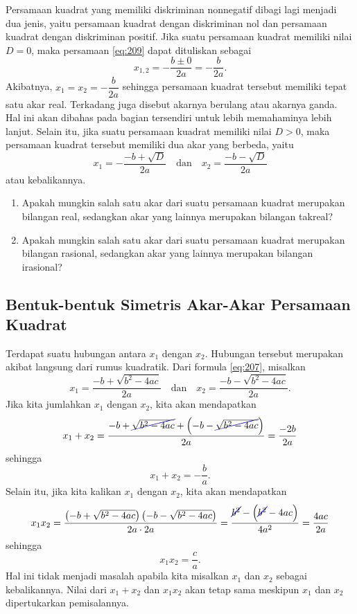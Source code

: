 	\par Persamaan kuadrat yang memiliki diskriminan nonnegatif dibagi lagi menjadi dua jenis, yaitu persamaan kuadrat dengan diskriminan nol dan persamaan kuadrat dengan diskriminan positif. Jika suatu persamaan kuadrat memiliki nilai $ D = 0 $, maka persamaan \ref{eq:209} dapat dituliskan sebagai
	\[ x_{1, 2} = -\frac{b \pm 0}{2a} = -\frac{b}{2a}. \]
	Akibatnya, $ x_{1} = x_{2} = -\dfrac{b}{2a} $ sehingga persamaan kuadrat tersebut memiliki tepat satu akar real. Terkadang juga disebut akarnya berulang atau akarnya ganda. Hal ini akan dibahas pada bagian tersendiri untuk lebih memahaminya lebih lanjut. Selain itu, jika suatu persamaan kuadrat memiliki nilai $ D > 0 $, maka persamaan kuadrat tersebut memiliki dua akar yang berbeda, yaitu
	\[ x_{1} = -\frac{-b + \sqrt{D}}{2a} \quad \mbox{dan} \quad x_{2} = \frac{-b - \sqrt{D}}{2a} \]
	atau kebalikannya.
	
	\begin{explbox}
		\begin{enumerate}[nosep, leftmargin=*]
			\item Apakah mungkin salah satu akar dari suatu persamaan kuadrat merupakan bilangan real, sedangkan akar yang lainnya merupakan bilangan takreal?
			\item Apakah mungkin salah satu akar dari suatu persamaan kuadrat merupakan bilangan rasional, sedangkan akar yang lainnya merupakan bilangan irasional?
		\end{enumerate}
	\end{explbox}
	
\subsection{Bentuk-bentuk Simetris Akar-Akar Persamaan Kuadrat}
	
	Terdapat suatu hubungan antara $ x_{1} $ dengan $ x_{2} $. Hubungan tersebut merupakan akibat langsung dari rumus kuadratik. Dari formula \ref{eq:207}, misalkan
	\[ x_{1} = \frac{-b + \sqrt{b^{2} - 4ac}}{2a} \quad \mbox{dan} \quad x_{2} = \frac{-b - \sqrt{b^{2} - 4ac}}{2a}. \]
	Jika kita jumlahkan $ x_{1} $ dengan $ x_{2} $, kita akan mendapatkan
	\[ x_{1} + x_{2} = \frac{-b + \ccancel[blue]{\sqrt{b^{2} - 4ac}} + \left(-b - \ccancel[blue]{\sqrt{b^{2} - 4ac}}\right)}{2a} = \frac{-2b}{2a} \]
	sehingga
	\begin{equation} \label{eq:210}
		x_{1} + x_{2} = -\frac{b}{a}.
	\end{equation}
	Selain itu, jika kita kalikan $ x_{1} $ dengan $ x_{2} $, kita akan mendapatkan
	\[ x_{1}x_{2} = \frac{\left(-b + \sqrt{b^{2} - 4ac}\right)\left(-b - \sqrt{b^{2} - 4ac}\right)}{2a \cdot 2a} = \frac{\ccancel[blue]{b^{2}} - \left(\ccancel[blue]{b^{2}} - 4ac\right)}{4a^{2}} = \frac{4ac}{2a} \]
	sehingga
	\begin{equation} \label{eq:211}
		x_{1}x_{2} = \frac{c}{a}.
	\end{equation}
	Hal ini tidak menjadi masalah apabila kita misalkan $ x_{1} $ dan $ x_{2} $ sebagai kebalikannya. Nilai dari $ x_{1} + x_{2} $ dan $ x_{1}x_{2} $ akan tetap sama meskipun $ x_{1} $ dan $ x_{2} $ dipertukarkan pemisalannya.
	
